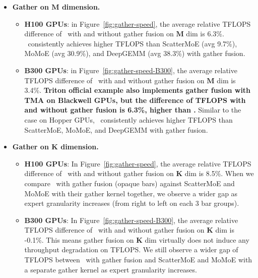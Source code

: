 \begin{itemize}
    \item \textbf{Gather on $\mathbf{M}$ dimension.} 

    \begin{itemize}
        \item \textbf{H100 GPUs}: in Figure~\ref{fig:gather-speed}, the average relative TFLOPS difference of \Algname~with and without gather fusion on $\mathbf{M}$ dim is 6.3\%. \Algname~consistently achieves higher TFLOPS than ScatterMoE (avg 9.7\%), MoMoE (avg 30.9\%), and DeepGEMM (avg 38.3\%) with gather fusion.
    
        
        \item \textbf{B300 GPUs}: in Figure~\ref{fig:gather-speed-B300}, the average relative TFLOPS difference of \Algname~with and without gather fusion on $\mathbf{M}$ dim is 3.4\%. \textbf{Triton official example also implements gather fusion with TMA on Blackwell GPUs, but the difference of TFLOPS with and without gather fusion is 6.3\%, higher than \Algname.} Similar to the case on Hopper GPUs, \Algname~consistently achieves higher TFLOPS than ScatterMoE, MoMoE, and DeepGEMM with gather fusion.
    \end{itemize}
        
    
    \item \textbf{Gather on $\mathbf{K}$ dimension.} 

        \begin{itemize}
        \item \textbf{H100 GPUs}: In Figure~\ref{fig:gather-speed}, the average relative TFLOPS difference of \Algname~with and without gather fusion on $\mathbf{K}$ dim is 8.5\%. When we compare \Algname~with gather fusion (opaque bars) against ScatterMoE and MoMoE with their gather kernel together, we observe a wider gap as expert granularity increases (from right to left on each 3 bar groups). 
        
        
    
        
        \item \textbf{B300 GPUs}:  In Figure~\ref{fig:gather-speed-B300}, the average relative TFLOPS difference of \Algname~with and without gather fusion on $\mathbf{K}$ dim is -0.1\%. This means gather fusion on $\mathbf{K}$ dim virtually does not induce any throughput degradation on TFLOPS. We still observe a wider gap of TFLOPS between \Algname~with gather fusion and ScatterMoE and MoMoE with a separate gather kernel as expert granularity increases. 
    \end{itemize}
        
\end{itemize}

